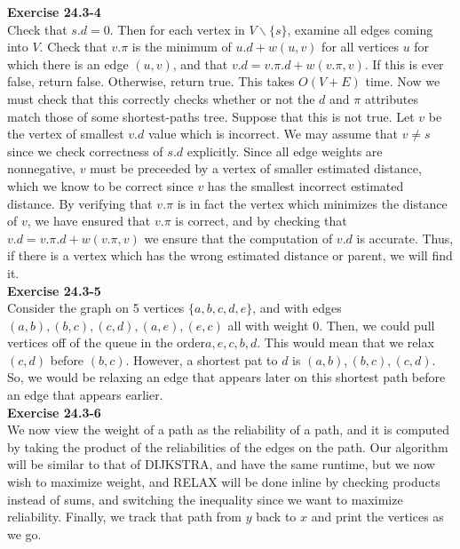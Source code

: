\documentclass{article}
\begin{document}
\noindent\textbf{Exercise 24.3-4}\\

Check that $s.d = 0$.  Then for each vertex in $V\backslash \{s\}$, examine all edges coming into $V$.   Check that $v.\pi$ is the minimum of $u.d + w(u,v)$ for all vertices $u$ for which there is an edge $(u,v)$, and that $v.d = v.\pi.d + w(v.\pi, v)$.  If this is ever false, return false.  Otherwise, return true.  This takes $O(V+E)$ time.  Now we must check that this correctly checks whether or not the $d$ and $\pi$ attributes match those of some shortest-paths tree.  Suppose that this is not true.  Let $v$ be the vertex of smallest $v.d$ value which is incorrect.  We may assume that $v \neq s$ since we check correctness of $s.d$ explicitly.  Since all edge weights are nonnegative, $v$ must be preceeded by a vertex of smaller estimated distance, which we know to be correct since $v$ has the smallest incorrect estimated distance. By verifying that $v.\pi$ is in fact the vertex which minimizes the distance of $v$, we have ensured that $v.\pi$ is correct, and by checking that $v.d = v.\pi.d + w(v.\pi, v)$ we ensure that the computation of $v.d$ is accurate.  Thus, if there is a vertex which has the wrong estimated distance or parent, we will find it. \\

\noindent\textbf{Exercise 24.3-5}\\

Consider the graph on 5 vertices $\{a,b,c,d,e\}$, and with edges $(a,b),(b,c),(c,d),(a,e),(e,c)$ all with weight 0. Then, we could pull vertices off of the queue in the order$a,e,c,b,d$. This would mean that we relax $(c,d)$ before $(b,c)$. However, a shortest pat to $d$ is $(a,b),(b,c),(c,d)$. So, we would be relaxing an edge that appears later on this shortest path before an edge that appears earlier.\\

\noindent\textbf{Exercise 24.3-6}\\

We now view the weight of a path as the reliability of a path, and it is computed by taking the product of the reliabilities of the edges on the path. Our algorithm will be similar to that of DIJKSTRA, and have the same runtime, but we now wish to maximize weight, and RELAX will be done inline by checking products instead of sums, and switching the inequality since we want to maximize reliability.  Finally, we track that path from $y$ back to $x$ and print the vertices as we go. \\
\end{document}
